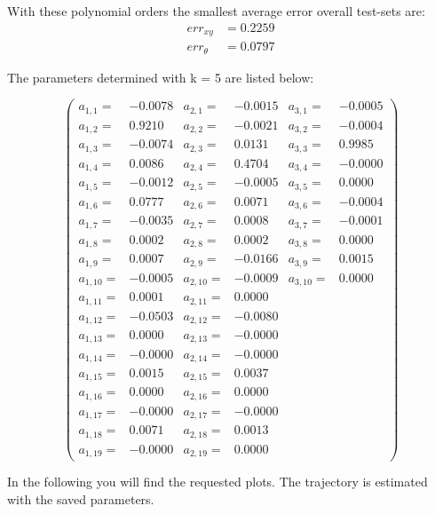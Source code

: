 \documentclass[conference]{IEEEtran}
\begin{document}
\begin{compactenum}[a)]
With these polynomial orders the smallest average error overall test-sets are:
\begin{align}
	err_{xy} & = 0.2259\\
	err_{\theta} & = 0.0797
\end{align}

The parameters determined with k = 5 are listed below:

$$
\left(
\scriptscriptstyle{
\begin{smallmatrix}
a_{1,1} =&   -0.0078&	a_{2,1} =&   -0.0015&	a_{3,1} =&  -0.0005 \\
a_{1,2} =&    0.9210&	a_{2,2} =&   -0.0021&	a_{3,2} =&	-0.0004	\\
a_{1,3} =&   -0.0074& 	a_{2,3} =&    0.0131&	a_{3,3} =&	 0.9985	\\
a_{1,4} =&    0.0086&	a_{2,4} =&    0.4704&	a_{3,4} =&	-0.0000	\\
a_{1,5} =&   -0.0012&	a_{2,5} =&   -0.0005&	a_{3,5} =&	 0.0000	\\
a_{1,6} =&    0.0777&	a_{2,6} =&    0.0071&	a_{3,6} =&	-0.0004	\\
a_{1,7} =&   -0.0035&	a_{2,7} =&    0.0008&	a_{3,7} =&	-0.0001	\\
a_{1,8} =&    0.0002&	a_{2,8} =&    0.0002&	a_{3,8} =&	 0.0000	\\
a_{1,9} =&    0.0007&	a_{2,9} =&   -0.0166&	a_{3,9} =&	 0.0015	\\
a_{1,10} =&   -0.0005&	a_{2,10} =&   -0.0009&	a_{3,10} =&	 0.0000	\\
a_{1,11} =&    0.0001&	a_{2,11} =&    0.0000	\\
a_{1,12} =&   -0.0503&	a_{2,12} =&   -0.0080	\\
a_{1,13} =&    0.0000&	a_{2,13} =&   -0.0000	\\
a_{1,14} =&   -0.0000&	a_{2,14} =&   -0.0000	\\
a_{1,15} =&    0.0015&	a_{2,15} =&    0.0037	\\
a_{1,16} =&    0.0000&	a_{2,16} =&    0.0000	\\
a_{1,17} =&   -0.0000&	a_{2,17} =&   -0.0000	\\
a_{1,18} =&    0.0071&	a_{2,18} =&    0.0013	\\
a_{1,19} =&   -0.0000&	a_{2,19} =&    0.0000	
\end{smallmatrix}}
\right)
$$
\item In the following you will find the requested plots. The trajectory is estimated with the saved parameters.
\begin{figure}[h!]
  	\centering

\end{figure}
\end{compactenum}
\end{document}
